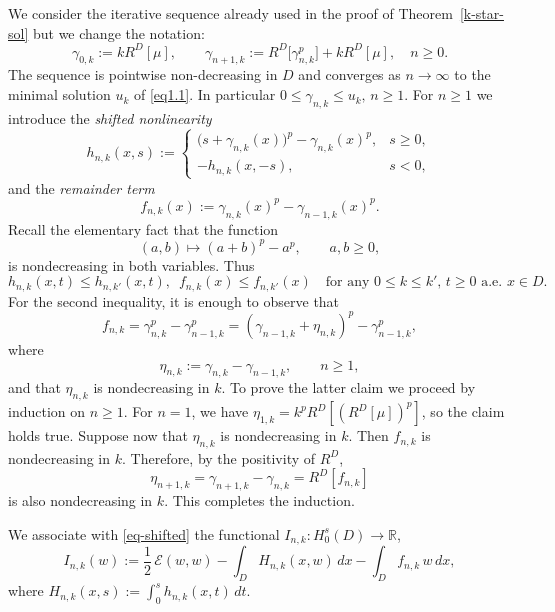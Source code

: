\documentclass[11pt,a4paper,reqno]{amsart}
\theoremstyle{definition}
\numberwithin{equation}{section}
\begin{document}
We consider the iterative sequence   already used in the 
proof of Theorem~\ref{k-star-sol} but we change the notation:
\begin{equation}
\label{def-gamma}
  \gamma_{0,k}:=kR^{D}[\mu],\qquad
  \gamma_{n+1,k}:=R^{D}\!\bigl[\gamma_{n,k}^{p}\bigr]+kR^{D}[\mu],
  \quad n\geq0.
\end{equation}
The sequence is pointwise non-decreasing in $D$ and converges as $n\to\infty$ to the minimal
solution $u_{k}$ of \eqref{eq1.1}.  In particular $0\leq\gamma_{n,k}
\leq u_{k},\, n\ge 1$. For  $n\geq1$  we
introduce the \emph{shifted nonlinearity}
\begin{equation}\label{shift-nonl}
  h_{n,k}(x,s):=
  \begin{cases}
    \bigl(s+\gamma_{n,k}(x)\bigr)^{p}-\gamma_{n,k}(x)^{p}, & s\geq0,\\
    -h_{n,k}(x,-s), & s<0,
  \end{cases}
\end{equation}
and the \emph{remainder term}
\begin{equation}
\label{rem-term}
  f_{n,k}(x):=\gamma_{n,k}(x)^{p}-\gamma_{n-1,k}(x)^{p}.
\end{equation}
Recall the elementary fact that the function 
\[
 (a,b)\mapsto (a+b)^{p}-a^{p},\qquad a,b\geq 0,
\]
is nondecreasing in both variables. Thus
\begin{equation}
\label{eq.mon1}
h_{n,k}(x,t)\le h_{n,k'}(x,t),\,\,\, f_{n,k}(x)\le f_{n,k'}(x)\quad \text{for any }0\le k\le k',\, t\ge 0 \text { a.e. }x\in D.
\end{equation}
For the second inequality, it is enough to observe that 
\[
f_{n,k}=\gamma_{n,k}^{p}-\gamma_{n-1,k}^{p}=(\gamma_{n-1,k}+\eta_{n,k})^{p}-\gamma_{n-1,k}^{p},
\]
where 
\[
\eta_{n,k}:=\gamma_{n,k}-\gamma_{n-1,k},\qquad n\geq 1,
\]
and that $\eta_{n,k}$ is nondecreasing in $k$.
To prove the latter claim we proceed by induction on  $n\ge 1$. For $n=1$, we have $\eta_{1,k}=k^{p}R^{D}[(R^{D}[\mu])^{p}]$, so the claim holds true.
Suppose now that $\eta_{n,k}$ is nondecreasing in $k$.  Then $f_{n,k}$ is
nondecreasing in $k$. Therefore, by the positivity of $R^{D}$,
\[
\eta_{n+1,k}=\gamma_{n+1,k}-\gamma_{n,k}=R^{D}[f_{n,k}]
\]
is also nondecreasing in $k$. This completes the induction.





We associate with \eqref{eq-shifted} the functional
$I_{n,k}\colon H_{0}^{s}(D)\to\mathbb{R}$,
\begin{equation}
\label{func-shifted}
  I_{n,k}(w):=\frac{1}{2}\,\mathcal{E}(w,w)-\int_{D}H_{n,k}(x,w)\,dx
              -\int_{D}f_{n,k}\,w\,dx,
\end{equation}
where $H_{n,k}(x,s):=\int_{0}^{s}h_{n,k}(x,t)\,dt$.  
 
\end{document}
